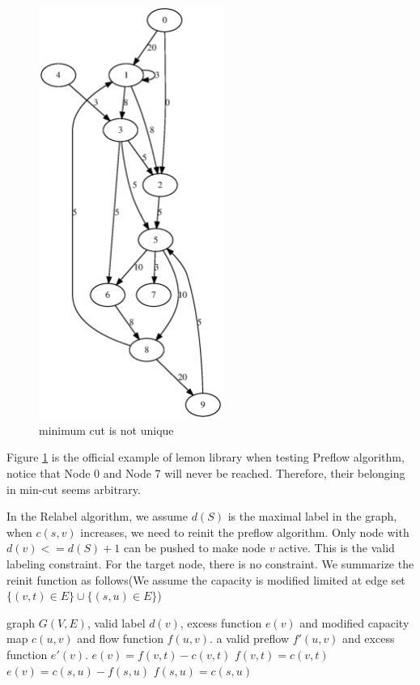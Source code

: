 \documentclass{article}
\begin{document}
\begin{figure}[!ht]
\centering
\includegraphics[width=6cm]{fig/test.eps}
\caption{minimum cut is not unique}\label{fig:ex}
\end{figure}

Figure \ref{fig:ex} is the official example of lemon library when testing Preflow algorithm, notice that Node 0 and Node 7 will never be reached. Therefore, their belonging in min-cut seems arbitrary. 

In the Relabel algorithm, we assume $d(S) $ is the maximal label in the graph, when $c(s,v)$ increases, we need to reinit the preflow algorithm. Only node with $d(v) <= d(S) + 1$ can be pushed to make node $v$ active. This is the valid labeling constraint. For the target node, there is no constraint. We summarize the reinit function as follows(We assume the capacity is modified limited at edge set $\{(v,t)\in E\}\cup \{(s,u)\in E\}$)
\begin{algorithmic}[1]
\REQUIRE graph $G(V,E)$, valid label $d(v)$, excess function $e(v)$ and modified capacity map $c(u,v)$ and flow function $f(u,v)$.
\ENSURE a valid preflow $f'(u,v)$ and excess function $e'(v)$.
\STATE $e(v) = f(v,t)-c(v,t)$
\STATE $f(v,t)=c(v,t)$
\ENDIF
\ENDFOR
{}
\STATE $e(v) = c(s,u)-f(s,u)$
\STATE $f(s,u)=c(s,u)$
\ENDIF
\ENDFOR
\end{algorithmic}
\end{document}
